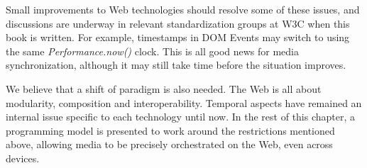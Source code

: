 Small improvements to Web technologies should resolve some of these issues,
and discussions are underway in relevant standardization groups at W3C when
this book is written. For example, timestamps in DOM Events may
switch to using the same \emph{Performance.now()} clock. This is all good news for
media synchronization, although it may still take time before the situation
improves.

We believe that a shift of paradigm is also needed. The Web is all about
modularity, composition and interoperability. Temporal aspects have remained
an internal issue specific to each technology until now. In the rest of this
chapter, a programming model is presented to work around the restrictions
mentioned above, allowing media to be precisely orchestrated on the Web, even
across devices.





